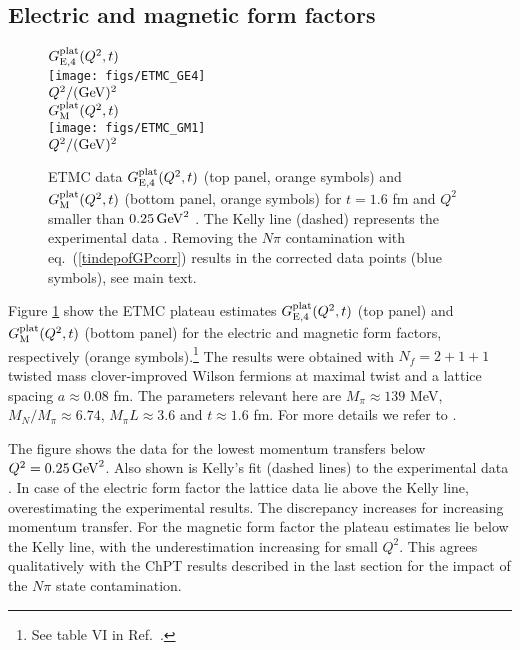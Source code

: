 \documentclass[11pt,prd,aps,showpacs,eqsecnum,floatfix,nofootinbib,preprint,tightenlines]{revtex4}
\newcommand{\pref}[1]{(\ref{#1})}
\begin{document}
\subsection{Electric and magnetic form factors}

% 
\begin{figure}[p]
\begin{center}
$G_{\rm E,4}^{\rm plat}(Q^2,t)$\\[1ex]
\texttt{[image: figs/ETMC\_GE4]}\\[0.4ex]
$Q^2/({\rm GeV})^2$\\[4ex]
$G_{\rm M}^{\rm plat}(Q^2,t)$\\[1ex]
\texttt{[image: figs/ETMC\_GM1]}\\[0.4ex]
$Q^2/({\rm GeV})^2$\\[0.8ex]
\caption{\label{fig:ETMCGM1} ETMC data $G^{\rm plat}_{{\rm E},4}(Q^2,t)$ (top panel, orange symbols) and $G^{\rm plat}_{\rm M}(Q^2,t)$ (bottom panel, orange symbols) for $t=1.6$ fm and $Q^2$ smaller than $0.25\, {\rm GeV}^2$ \cite{Alexandrou:2018sjm}. The Kelly line (dashed) represents the experimental data \cite{Kelly:2004hm}. Removing the $N\pi$ contamination with eq.\ \pref{tindepofGPcorr} results in the corrected data points (blue symbols), see main text.
}
\end{center}
\end{figure}

Figure \ref{fig:ETMCGM1} show the ETMC plateau estimates $G^{\rm plat}_{\rm E,4}(Q^2,t)$ (top panel) and $G^{\rm plat}_{\rm M}(Q^2,t)$ (bottom panel) for the electric and magnetic form factors, respectively (orange symbols).\footnote{See table VI in Ref.\ \cite{Alexandrou:2018sjm}.} The results were obtained with $N_f=2+1+1$ twisted mass clover-improved Wilson fermions at maximal twist and a lattice spacing $a\approx 0.08$  fm. The parameters relevant here are $M_{\pi}\approx139$ MeV, $M_N/M_{\pi}\approx 6.74$, $M_{\pi}L\approx 3.6$ and $t\approx 1.6$ fm. For more details we refer to \cite{Alexandrou:2018sjm}. 

The figure shows the data for the lowest momentum transfers below $Q^2=0.25\, {\rm GeV}^2$. Also shown is Kelly's fit (dashed lines) to the experimental data \cite{Kelly:2004hm}. In case of the electric form factor the lattice data lie above the Kelly line, overestimating the experimental results. The discrepancy increases for increasing momentum transfer. For the magnetic form factor the plateau estimates lie below the Kelly line, with the underestimation increasing for small $Q^2$. This agrees qualitatively with the ChPT results described in the last section for the impact of the $N\pi$ state contamination.
\end{document}
